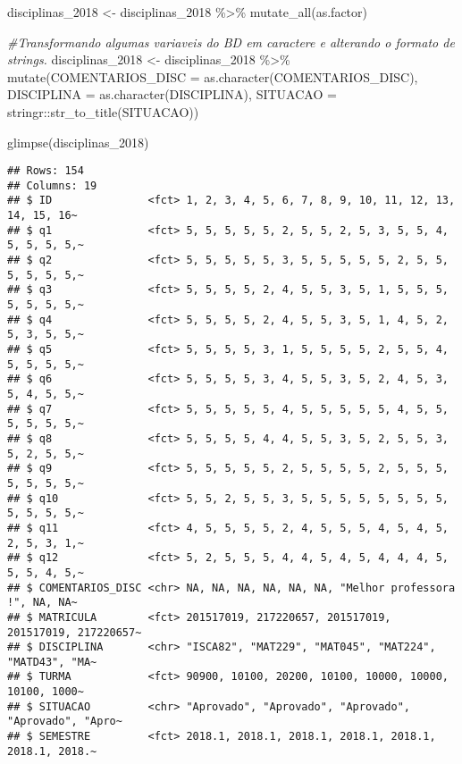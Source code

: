 \documentclass[
]{article}
\newenvironment{Shaded}{\begin{snugshade}}{\end{snugshade}}
\newcommand{\AttributeTok}[1]{\textcolor[rgb]{0.77,0.63,0.00}{#1}}
\newcommand{\CommentTok}[1]{\textcolor[rgb]{0.56,0.35,0.01}{\textit{#1}}}
\newcommand{\FunctionTok}[1]{\textcolor[rgb]{0.00,0.00,0.00}{#1}}
\newcommand{\NormalTok}[1]{#1}
\newcommand{\OtherTok}[1]{\textcolor[rgb]{0.56,0.35,0.01}{#1}}
\newcommand{\SpecialCharTok}[1]{\textcolor[rgb]{0.00,0.00,0.00}{#1}}
\begin{document}
\begin{Shaded}
\begin{Highlighting}[]
\NormalTok{disciplinas\_2018 }\OtherTok{\textless{}{-}}\NormalTok{ disciplinas\_2018 }\SpecialCharTok{\%\textgreater{}\%} 
  \FunctionTok{mutate\_all}\NormalTok{(as.factor)}

\CommentTok{\#Transformando algumas variaveis do BD em caractere e alterando o formato de strings.}
\NormalTok{disciplinas\_2018 }\OtherTok{\textless{}{-}}\NormalTok{ disciplinas\_2018 }\SpecialCharTok{\%\textgreater{}\%} 
  \FunctionTok{mutate}\NormalTok{(}\AttributeTok{COMENTARIOS\_DISC =} \FunctionTok{as.character}\NormalTok{(COMENTARIOS\_DISC),}
         \AttributeTok{DISCIPLINA =} \FunctionTok{as.character}\NormalTok{(DISCIPLINA),}
         \AttributeTok{SITUACAO =}\NormalTok{ stringr}\SpecialCharTok{::}\FunctionTok{str\_to\_title}\NormalTok{(SITUACAO))}

\FunctionTok{glimpse}\NormalTok{(disciplinas\_2018)}
\end{Highlighting}
\end{Shaded}

\begin{verbatim}
## Rows: 154
## Columns: 19
## $ ID               <fct> 1, 2, 3, 4, 5, 6, 7, 8, 9, 10, 11, 12, 13, 14, 15, 16~
## $ q1               <fct> 5, 5, 5, 5, 5, 2, 5, 5, 2, 5, 3, 5, 5, 4, 5, 5, 5, 5,~
## $ q2               <fct> 5, 5, 5, 5, 5, 3, 5, 5, 5, 5, 5, 2, 5, 5, 5, 5, 5, 5,~
## $ q3               <fct> 5, 5, 5, 5, 2, 4, 5, 5, 3, 5, 1, 5, 5, 5, 5, 5, 5, 5,~
## $ q4               <fct> 5, 5, 5, 5, 2, 4, 5, 5, 3, 5, 1, 4, 5, 2, 5, 3, 5, 5,~
## $ q5               <fct> 5, 5, 5, 5, 3, 1, 5, 5, 5, 5, 2, 5, 5, 4, 5, 5, 5, 5,~
## $ q6               <fct> 5, 5, 5, 5, 3, 4, 5, 5, 3, 5, 2, 4, 5, 3, 5, 4, 5, 5,~
## $ q7               <fct> 5, 5, 5, 5, 5, 4, 5, 5, 5, 5, 5, 4, 5, 5, 5, 5, 5, 5,~
## $ q8               <fct> 5, 5, 5, 5, 4, 4, 5, 5, 3, 5, 2, 5, 5, 3, 5, 2, 5, 5,~
## $ q9               <fct> 5, 5, 5, 5, 5, 2, 5, 5, 5, 5, 2, 5, 5, 5, 5, 5, 5, 5,~
## $ q10              <fct> 5, 5, 2, 5, 5, 3, 5, 5, 5, 5, 5, 5, 5, 5, 5, 5, 5, 5,~
## $ q11              <fct> 4, 5, 5, 5, 5, 2, 4, 5, 5, 5, 4, 5, 4, 5, 2, 5, 3, 1,~
## $ q12              <fct> 5, 2, 5, 5, 5, 4, 4, 5, 4, 5, 4, 4, 4, 5, 5, 5, 4, 5,~
## $ COMENTARIOS_DISC <chr> NA, NA, NA, NA, NA, NA, "Melhor professora !", NA, NA~
## $ MATRICULA        <fct> 201517019, 217220657, 201517019, 201517019, 217220657~
## $ DISCIPLINA       <chr> "ISCA82", "MAT229", "MAT045", "MAT224", "MATD43", "MA~
## $ TURMA            <fct> 90900, 10100, 20200, 10100, 10000, 10000, 10100, 1000~
## $ SITUACAO         <chr> "Aprovado", "Aprovado", "Aprovado", "Aprovado", "Apro~
## $ SEMESTRE         <fct> 2018.1, 2018.1, 2018.1, 2018.1, 2018.1, 2018.1, 2018.~
\end{verbatim}
\end{document}
